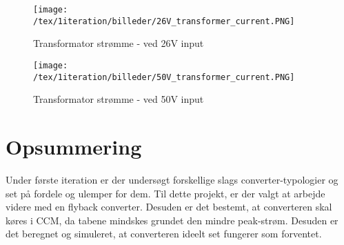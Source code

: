 \begin{figure}[H]
	\center
	\texttt{[image: /tex/1iteration/billeder/26V\_transformer\_current.PNG]}
	\caption{Transformator strømme - ved 26V input}
	\label{fig:26V_transformer_current}
\end{figure}

\begin{figure}[H]
	\center
	\texttt{[image: /tex/1iteration/billeder/50V\_transformer\_current.PNG]}
	\caption{Transformator strømme - ved 50V input}
	\label{fig:50V_transformer_current}
\end{figure}

\section{Opsummering}
Under første iteration er der undersøgt forskellige slags converter-typologier og set på fordele og ulemper for dem. Til dette projekt, er der valgt at arbejde videre med en flyback converter. Desuden er det bestemt, at converteren skal køres i CCM, da tabene mindskes grundet den mindre peak-strøm. Desuden er det beregnet og simuleret, at converteren ideelt set fungerer som forventet.   

